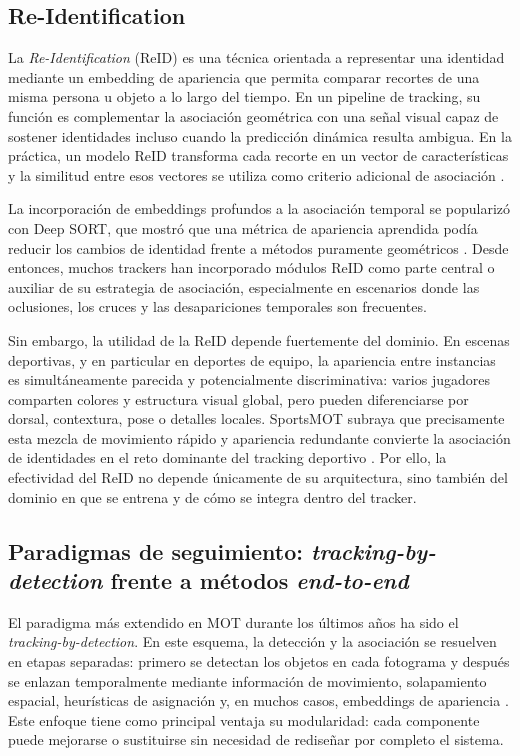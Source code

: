 \documentclass[../MAIN.tex]{subfiles}
\begin{document}
\subsection{Re-Identification}

La \textit{Re-Identification} (ReID) es una técnica orientada a representar una identidad mediante un embedding de apariencia que permita comparar recortes de una misma persona u objeto a lo largo del tiempo. En un pipeline de tracking, su función es complementar la asociación geométrica con una señal visual capaz de sostener identidades incluso cuando la predicción dinámica resulta ambigua. En la práctica, un modelo ReID transforma cada recorte en un vector de características y la similitud entre esos vectores se utiliza como criterio adicional de asociación \parencite{wojke2017deepsort,ciaparrone2020survey}.

La incorporación de embeddings profundos a la asociación temporal se popularizó con Deep SORT, que mostró que una métrica de apariencia aprendida podía reducir los cambios de identidad frente a métodos puramente geométricos \parencite{wojke2017deepsort}. Desde entonces, muchos trackers han incorporado módulos ReID como parte central o auxiliar de su estrategia de asociación, especialmente en escenarios donde las oclusiones, los cruces y las desapariciones temporales son frecuentes.

Sin embargo, la utilidad de la ReID depende fuertemente del dominio. En escenas deportivas, y en particular en deportes de equipo, la apariencia entre instancias es simultáneamente parecida y potencialmente discriminativa: varios jugadores comparten colores y estructura visual global, pero pueden diferenciarse por dorsal, contextura, pose o detalles locales. SportsMOT subraya que precisamente esta mezcla de movimiento rápido y apariencia redundante convierte la asociación de identidades en el reto dominante del tracking deportivo \parencite{cui2023sportsmot}. Por ello, la efectividad del ReID no depende únicamente de su arquitectura, sino también del dominio en que se entrena y de cómo se integra dentro del tracker.

\subsection{Paradigmas de seguimiento: \textit{tracking-by-detection} frente a métodos \textit{end-to-end}}

El paradigma más extendido en MOT durante los últimos años ha sido el \textit{tracking-by-detection}. En este esquema, la detección y la asociación se resuelven en etapas separadas: primero se detectan los objetos en cada fotograma y después se enlazan temporalmente mediante información de movimiento, solapamiento espacial, heurísticas de asignación y, en muchos casos, embeddings de apariencia \parencite{ciaparrone2020survey,wojke2017deepsort,zhang2022bytetrack}. Este enfoque tiene como principal ventaja su modularidad: cada componente puede mejorarse o sustituirse sin necesidad de rediseñar por completo el sistema.
\end{document}
